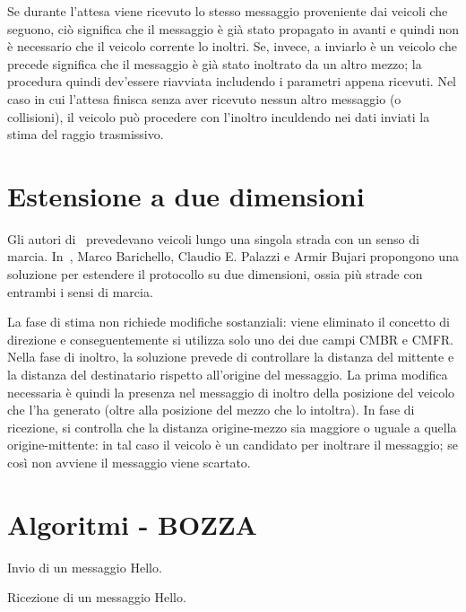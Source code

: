Se durante l'attesa viene ricevuto lo stesso messaggio proveniente dai veicoli che seguono, ciò significa che il messaggio è già stato propagato in avanti e quindi non è necessario
che il veicolo corrente lo inoltri.
Se, invece, a inviarlo è un veicolo che precede significa che il messaggio è già stato inoltrato da un altro mezzo; la procedura quindi dev'essere riavviata includendo i parametri appena ricevuti.
Nel caso in cui l'attesa finisca senza aver ricevuto nessun altro messaggio (o collisioni), il veicolo può procedere con l'inoltro inculdendo nei dati inviati la stima del raggio trasmissivo.
%
\section{Estensione a due dimensioni}
Gli autori di~\cite{Palazzi07howdo} prevedevano veicoli lungo una singola strada con un senso di marcia.
In~\cite{Barichello2017propagazione}, Marco Barichello, Claudio E. Palazzi e Armir Bujari propongono una soluzione per estendere il protocollo su due dimensioni,
ossia più strade con entrambi i sensi di marcia.

La fase di stima non richiede modifiche sostanziali: viene eliminato il concetto di direzione e conseguentemente si utilizza solo uno dei due campi CMBR e CMFR.
Nella fase di inoltro, la soluzione prevede di controllare la distanza del mittente e la distanza del destinatario rispetto all'origine del messaggio.
La prima modifica necessaria è quindi la presenza nel messaggio di inoltro della posizione del veicolo che l'ha generato (oltre alla posizione del mezzo che lo intoltra).
In fase di ricezione, si controlla che la distanza origine-mezzo sia maggiore o uguale a quella origine-mittente: in tal caso il veicolo è un candidato per inoltrare il messaggio;
se così non avviene il messaggio viene scartato.
%
\section{Algoritmi - BOZZA}
\begin{algorithm}[!h]
\caption{Invio di un messaggio Hello.}\label{fig:algoritmo-invio-msg-hello}
\begin{algorithmic}[1]
		\EndIf{}
	\EndFor{}
\end{algorithmic}
\end{algorithm}
%
\begin{algorithm}[!h]
\caption{Ricezione di un messaggio Hello.}\label{fig:algoritmo-ricezione-msg-hello}
\begin{algorithmic}[1]
\end{algorithmic}
\end{algorithm}

